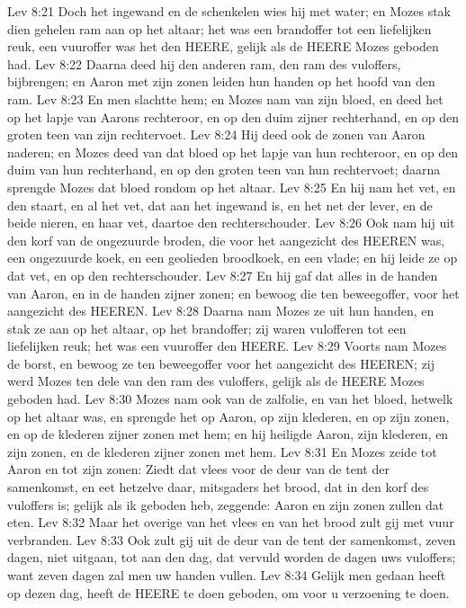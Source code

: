 Lev 8:21  Doch het ingewand en de schenkelen wies hij met water; en Mozes stak dien gehelen ram aan op het altaar; het was een brandoffer tot een liefelijken reuk, een vuuroffer was het den HEERE, gelijk als de HEERE Mozes geboden had.
Lev 8:22  Daarna deed hij den anderen ram, den ram des vuloffers, bijbrengen; en Aaron met zijn zonen leiden hun handen op het hoofd van den ram.
Lev 8:23  En men slachtte hem; en Mozes nam van zijn bloed, en deed het op het lapje van Aarons rechteroor, en op den duim zijner rechterhand, en op den groten teen van zijn rechtervoet.
Lev 8:24  Hij deed ook de zonen van Aaron naderen; en Mozes deed van dat bloed op het lapje van hun rechteroor, en op den duim van hun rechterhand, en op den groten teen van hun rechtervoet; daarna sprengde Mozes dat bloed rondom op het altaar.
Lev 8:25  En hij nam het vet, en den staart, en al het vet, dat aan het ingewand is, en het net der lever, en de beide nieren, en haar vet, daartoe den rechterschouder.
Lev 8:26  Ook nam hij uit den korf van de ongezuurde broden, die voor het aangezicht des HEEREN was, een ongezuurde koek, en een geolieden broodkoek, en een vlade; en hij leide ze op dat vet, en op den rechterschouder.
Lev 8:27  En hij gaf dat alles in de handen van Aaron, en in de handen zijner zonen; en bewoog die ten beweegoffer, voor het aangezicht des HEEREN.
Lev 8:28  Daarna nam Mozes ze uit hun handen, en stak ze aan op het altaar, op het brandoffer; zij waren vulofferen tot een liefelijken reuk; het was een vuuroffer den HEERE.
Lev 8:29  Voorts nam Mozes de borst, en bewoog ze ten beweegoffer voor het aangezicht des HEEREN; zij werd Mozes ten dele van den ram des vuloffers, gelijk als de HEERE Mozes geboden had.
Lev 8:30  Mozes nam ook van de zalfolie, en van het bloed, hetwelk op het altaar was, en sprengde het op Aaron, op zijn klederen, en op zijn zonen, en op de klederen zijner zonen met hem; en hij heiligde Aaron, zijn klederen, en zijn zonen, en de klederen zijner zonen met hem.
Lev 8:31  En Mozes zeide tot Aaron en tot zijn zonen: Ziedt dat vlees voor de deur van de tent der samenkomst, en eet hetzelve daar, mitsgaders het brood, dat in den korf des vuloffers is; gelijk als ik geboden heb, zeggende: Aaron en zijn zonen zullen dat eten.
Lev 8:32  Maar het overige van het vlees en van het brood zult gij met vuur verbranden.
Lev 8:33  Ook zult gij uit de deur van de tent der samenkomst, zeven dagen, niet uitgaan, tot aan den dag, dat vervuld worden de dagen uws vuloffers; want zeven dagen zal men uw handen vullen.
Lev 8:34  Gelijk men gedaan heeft op dezen dag, heeft de HEERE te doen geboden, om voor u verzoening te doen.
